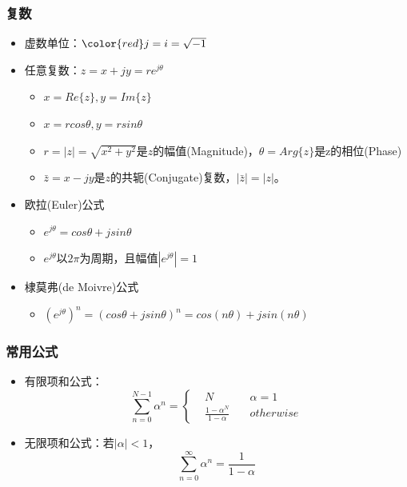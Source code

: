 \documentclass[CJKutf8,dvipsnames,table]{beamer}
\newif\ifxetexorluatex %
\begin{document}
\begin{CJK*}{UTF8}{song}
  \begin{frame}
    \frametitle{复数} 
    \begin{itemize}
    \item 虚数单位：${\color{red}j}=i=\sqrt{-1}$
    \item 任意复数：$z=x+jy=re^{j\theta}$
        \begin{itemize}
        \item $x=Re\{z\}, y=Im\{z\}$
        \item $x=r cos\theta, y=r sin\theta$
        \item $r=|z|=\sqrt{x^2+y^2}$是$z$的幅值(Magnitude)，$\theta=Arg\{z\}$是z的相位(Phase)
        \item $\bar{z}=x-jy$是$z$的共轭(Conjugate)复数，$|\bar{z}|=|z|$。
        \end{itemize}
    \item 欧拉(Euler)公式
        \begin{itemize}
        \item $e^{j\theta}=cos\theta+jsin\theta$
        \item $e^{j\theta}$以$2\pi$为周期，且幅值$|e^{j\theta}|=1$
        \end{itemize}
    \item 棣莫弗(de Moivre)公式
        \begin{itemize}
        \item ${(e^{j\theta})}^n={(cos\theta+jsin\theta)}^n=cos(n\theta)+jsin(n\theta)$
        \end{itemize}    
    \end{itemize}
  \end{frame}  
  
  \begin{frame}
    \frametitle{常用公式} 
    \begin{itemize}
    \item 有限项和公式：
    	\[
\sum_{n=0}^{N-1}\alpha^n = 
\left\{
    \begin {aligned}
         & N \quad & \alpha=1 \\
         & \frac{1-\alpha^N}{1-\alpha} \quad & otherwise                  
    \end{aligned}
\right.
		\]        

    \item 无限项和公式：若$|\alpha|<1$，\[ \sum_{n=0}^{\infty}\alpha^n=\frac{1}{1-\alpha} \]   
    \end{itemize}
  \end{frame}  

\ifxetexorluatex\else
\end{CJK*}
\fi
\end{document}
